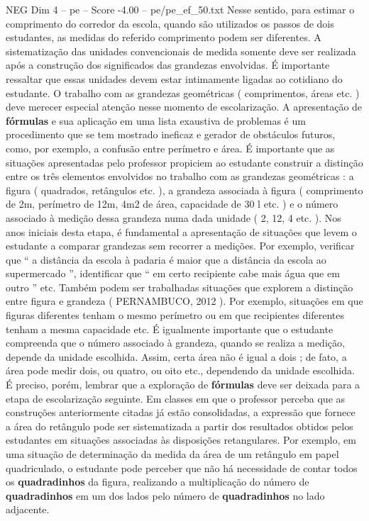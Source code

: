 \begin{textsample}{NEG Dim 4 – pe – Score -4.00 – pe/pe\_ef\_50.txt}
Nesse sentido, para estimar o comprimento do corredor da escola, quando são utilizados os passos de dois estudantes, as medidas do referido comprimento podem ser diferentes.
A sistematização das unidades convencionais de medida somente deve ser realizada após a construção dos significados das grandezas envolvidas.
É importante ressaltar que essas unidades devem estar intimamente ligadas ao cotidiano do estudante.
O trabalho com as grandezas geométricas ( comprimentos, áreas etc. ) deve merecer especial atenção nesse momento de escolarização.
A apresentação de \textbf{fórmulas} e sua aplicação em uma lista exaustiva de problemas é um procedimento que se tem mostrado ineficaz e gerador de obstáculos futuros, como, por exemplo, a confusão entre perímetro e área.
É importante que as situações apresentadas pelo professor propiciem ao estudante construir a distinção entre os três elementos envolvidos no trabalho com as grandezas geométricas : a figura ( quadrados, retângulos etc. ), a grandeza associada à figura ( comprimento de 2m, perímetro de 12m, 4m2 de área, capacidade de 30 l etc. ) e o número associado à medição dessa grandeza numa dada unidade ( 2, 12, 4 etc. ).
Nos anos iniciais desta etapa, é fundamental a apresentação de situações que levem o estudante a comparar grandezas sem recorrer a medições.
Por exemplo, verificar que “ a distância da escola à padaria é maior que a distância da escola ao supermercado ”, identificar que “ em certo recipiente cabe mais água que em outro ” etc.
Também podem ser trabalhadas situações que explorem a distinção entre figura e grandeza ( PERNAMBUCO, 2012 ).
Por exemplo, situações em que figuras diferentes tenham o mesmo perímetro ou em que recipientes diferentes tenham a mesma capacidade etc.
É igualmente importante que o estudante compreenda que o número associado à grandeza, quando se realiza a medição, depende da unidade escolhida.
Assim, certa área não é igual a dois ; de fato, a área pode medir dois, ou quatro, ou oito etc., dependendo da unidade escolhida.
É preciso, porém, lembrar que a exploração de \textbf{fórmulas} deve ser deixada para a etapa de escolarização seguinte.
Em classes em que o professor perceba que as construções anteriormente citadas já estão consolidadas, a expressão que fornece a área do retângulo pode ser sistematizada a partir dos resultados obtidos pelos estudantes em situações associadas às disposições retangulares.
Por exemplo, em uma situação de determinação da medida da área de um retângulo em papel quadriculado, o estudante pode perceber que não há necessidade de contar todos os \textbf{quadradinhos} da figura, realizando a multiplicação do número de \textbf{quadradinhos} em um dos lados pelo número de \textbf{quadradinhos} no lado adjacente.

\end{textsample}
